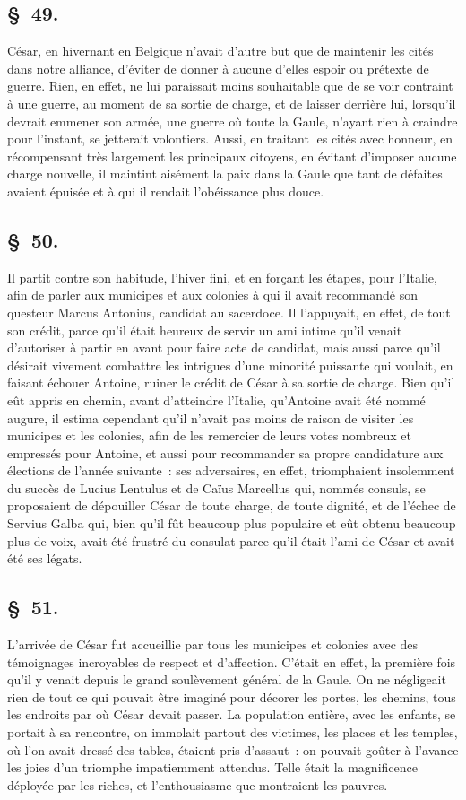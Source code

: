\documentclass[french,twoside]{book} %
\begin{document}
\subsection[{§ 49.}]{ \textsc{§ 49.} }
\noindent César, en hivernant en Belgique n’avait d’autre but que de maintenir les cités dans notre alliance, d’éviter de donner à aucune d’elles espoir ou prétexte de guerre. Rien, en effet, ne lui paraissait moins souhaitable que de se voir contraint à une guerre, au moment de sa sortie de charge, et de laisser derrière lui, lorsqu’il devrait emmener son armée, une guerre où toute la Gaule, n’ayant rien à craindre pour l’instant, se jetterait volontiers. Aussi, en traitant les cités avec honneur, en récompensant très largement les principaux citoyens, en évitant d’imposer aucune charge nouvelle, il maintint aisément la paix dans la Gaule que tant de défaites avaient épuisée et à qui il rendait l’obéissance plus douce.
\subsection[{§ 50.}]{ \textsc{§ 50.} }
\noindent Il partit contre son habitude, l’hiver fini, et en forçant les étapes, pour l’Italie, afin de parler aux municipes et aux colonies à qui il avait recommandé son questeur Marcus Antonius, candidat au sacerdoce. Il l’appuyait, en effet, de tout son crédit, parce qu’il était heureux de servir un ami intime qu’il venait d’autoriser à partir en avant pour faire acte de candidat, mais aussi parce qu’il désirait vivement combattre les intrigues d’une minorité puissante qui voulait, en faisant échouer Antoine, ruiner le crédit de César à sa sortie de charge. Bien qu’il eût appris en chemin, avant d’atteindre l’Italie, qu’Antoine avait été nommé augure, il estima cependant qu’il n’avait pas moins de raison de visiter les municipes et les colonies, afin de les remercier de leurs votes nombreux et empressés pour Antoine, et aussi pour recommander sa propre candidature aux élections de l’année suivante : ses adversaires, en effet, triomphaient insolemment du succès de Lucius Lentulus et de Caïus Marcellus qui, nommés consuls, se proposaient de dépouiller César de toute charge, de toute dignité, et de l’échec de Servius Galba qui, bien qu’il fût beaucoup plus populaire et eût obtenu beaucoup plus de voix, avait été frustré du consulat parce qu’il était l’ami de César et avait été ses légats.
\subsection[{§ 51.}]{ \textsc{§ 51.} }
\noindent L'arrivée de César fut accueillie par tous les municipes et colonies avec des témoignages incroyables de respect et d’affection. C'était en effet, la première fois qu’il y venait depuis le grand soulèvement général de la Gaule. On ne négligeait rien de tout ce qui pouvait être imaginé pour décorer les portes, les chemins, tous les endroits par où César devait passer. La population entière, avec les enfants, se portait à sa rencontre, on immolait partout des victimes, les places et les temples, où l’on avait dressé des tables, étaient pris d’assaut : on pouvait goûter à l’avance les joies d’un triomphe impatiemment attendus. Telle était la magnificence déployée par les riches, et l’enthousiasme que montraient les pauvres.
\end{document}
